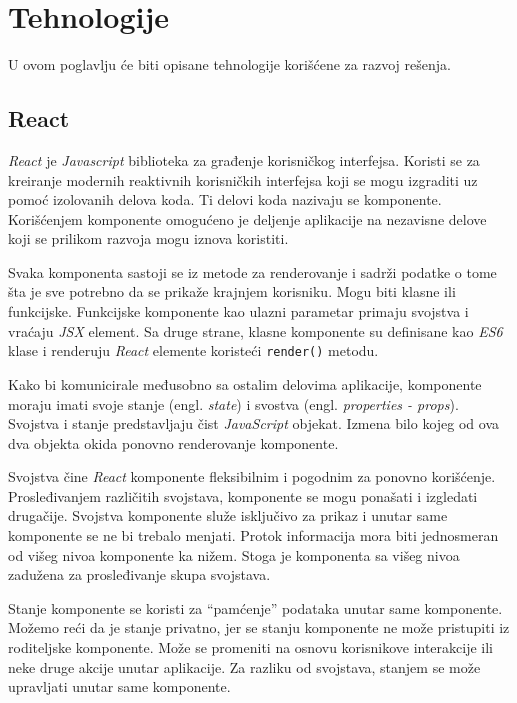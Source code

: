 \chapter{Tehnologije}\label{ch:tehnologije}

U ovom poglavlju će biti opisane tehnologije korišćene za razvoj rešenja.

\section{React}\label{sec:react}
\textit{React} je \textit{Javascript} biblioteka za građenje korisničkog interfejsa. Koristi se za kreiranje modernih 
reaktivnih korisničkih interfejsa koji se mogu izgraditi uz pomoć izolovanih delova koda. Ti delovi koda nazivaju 
se komponente. Korišćenjem komponente omogućeno je deljenje aplikacije na nezavisne delove koji se prilikom razvoja 
mogu iznova koristiti.~\cite{react}

Svaka komponenta sastoji se iz metode za renderovanje i sadrži podatke o tome šta je sve potrebno da se prikaže 
krajnjem korisniku. Mogu biti klasne ili funkcijske. Funkcijske komponente kao ulazni parametar primaju svojstva 
i vraćaju \textit{JSX} element. Sa druge strane, klasne komponente su definisane kao \textit{ES6} 
klase i renderuju \textit{React} elemente koristeći \texttt{render()} metodu. 

Kako bi komunicirale međusobno sa ostalim delovima aplikacije, komponente moraju imati svoje stanje (engl. \textit{state}) 
i svostva (engl. \textit{properties - props}). Svojstva i stanje predstavljaju čist \textit{JavaScript} objekat. Izmena bilo kojeg 
od ova dva objekta okida ponovno renderovanje komponente. 

Svojstva čine \textit{React} komponente fleksibilnim i pogodnim za 
ponovno korišćenje. Prosleđivanjem različitih svojstava, komponente se mogu ponašati i izgledati drugačije. Svojstva komponente 
služe isključivo za prikaz i unutar same komponente se ne bi trebalo menjati. Protok informacija mora biti jednosmeran od višeg 
nivoa komponente ka nižem. Stoga je komponenta sa višeg nivoa zadužena za prosleđivanje skupa svojstava.

Stanje komponente se koristi za “pamćenje” podataka unutar same komponente. Možemo reći da je stanje privatno, jer se stanju 
komponente ne može pristupiti iz roditeljske komponente. Može se promeniti na osnovu korisnikove interakcije ili neke druge 
akcije unutar aplikacije. Za razliku od svojstava, stanjem se može upravljati unutar same komponente.


